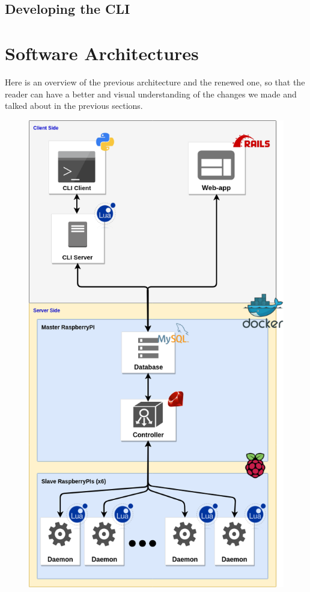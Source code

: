 \documentclass{eplmastersthesis}
\begin{document}
      \subsection{Developing the CLI}

    \section{Software Architectures}

      Here is an overview of the previous architecture and the renewed one,
      so that the reader can have a better and visual understanding
      of the changes we made and talked about in the previous sections.

      \begin{figure}[!tbp]
        \centering
        \begin{minipage}[b]{0.45\textwidth}
          \includegraphics[width=\textwidth]{figures/prev_arch.png}

\end{minipage}
\end{figure}
\end{document}
